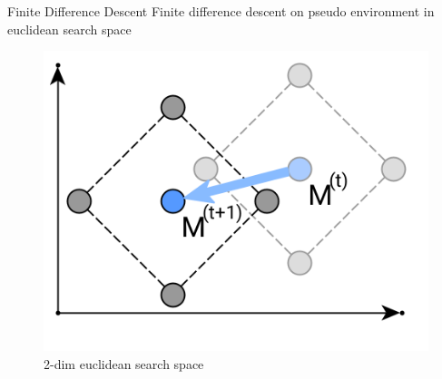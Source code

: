 \documentclass[]{beamer}
\begin{document}
\begin{frame}{Finite Difference Descent}
\vspace{10pt}
Finite difference descent on pseudo environment in euclidean search space
\vspace{10pt}
\vfill
\begin{figure}
\begin{center}
\begin{overprint}
\includegraphics[scale=0.32, center]{graphics/v2_window.png}
\caption{2-dim euclidean search space}
\end{overprint}
\end{center}
\end{figure}
\end{frame}
\end{document}
